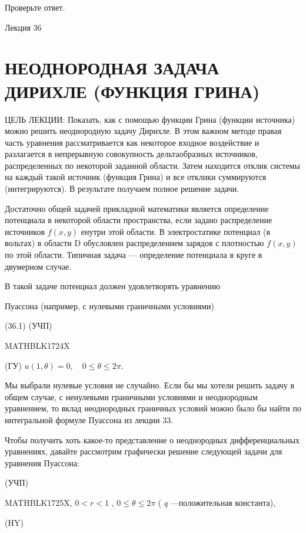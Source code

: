 \documentclass[
]{article}
\begin{document}
Проверьте ответ.

Лекция 36

\section{НЕОДНОРОДНАЯ ЗАДАЧА ДИРИХЛЕ (ФУНКЦИЯ
ГРИНА)}\label{ux43dux435ux43eux434ux43dux43eux440ux43eux434ux43dux430ux44f-ux437ux430ux434ux430ux447ux430-ux434ux438ux440ux438ux445ux43bux435-ux444ux443ux43dux43aux446ux438ux44f-ux433ux440ux438ux43dux430}

ЦЕЛЬ ЛЕКЦИИ: Показать, как с помощью функции Грина (функции источника)
можно решить неоднородную задачу Дирихле. В этом важном методе правая
часть уравнения рассматривается как некоторое входное воздействие и
разлагается в непрерывную совокупность дельтаобразных источников,
распределенных по некоторой заданной области. Затем находится отклик
системы на каждый такой источник (функция Грина) и все отклики
суммируются (интегрируются). В результате получаем полное решение
задачи.

Достаточно общей задачей прикладной математики является определение
потенциала в некоторой области пространства, если задано распределение
источников \(f(x, y)\) енутри этой области. В электростатике потенциал
(в вольтах) в области D обусловлен распределением зарядов с плотностью
\(f(x, y)\) по этой области. Типичная задача --- определение потенциала
в круге в двумерном случае.

В такой задаче потенциал должен удовлетворять уравнению

Пуассона (например, с нулевыми граничными условиями)

(36.1) (УЧП)

MATHBLK1724X

(ГУ) \(u(1, \theta) = 0, \quad 0 \le \theta \le 2\pi.\)

Мы выбрали нулевые условия не случайно. Если бы мы хотели решить задачу
в общем случае, с ненулевыми граничными условиями и неоднородным
уравнением, то вклад неоднородных граничных условий можно было бы найти
по интегральной формуле Пуассона из лекции 33.

Чтобы получить хоть какое-то представление о неоднородных
дифференциальных уравнениях, давайте рассмотрим графически решение
следующей задачи для уравнения Пуассона:

(УЧП)

MATHBLK1725X, \(0 < r < 1\) , \(0 \le \theta \le 2\pi\) ( \(q\)
---положительная константа),

(HY)
\end{document}
